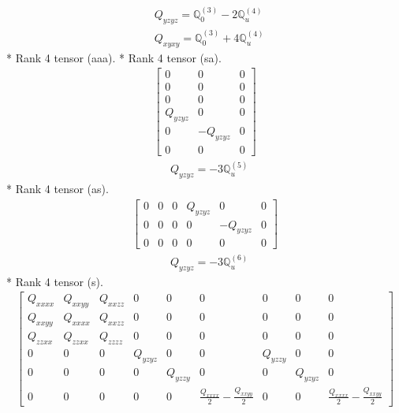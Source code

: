 \documentclass[fleqn,8pt,landscape]{jsarticle}
\begin{document}
\begin{align*}
& Q_{yzyz} = \mathbb{Q}_{0}^{(3)} - 2 \mathbb{Q}_{u}^{(4)} \\
& Q_{xyxy} = \mathbb{Q}_{0}^{(3)} + 4 \mathbb{Q}_{u}^{(4)}
\end{align*}
* Rank 4 tensor (aaa).
* Rank 4 tensor (sa).
\begin{align*}
\begin{bmatrix} 0 & 0 & 0 \\ 0 & 0 & 0 \\ 0 & 0 & 0 \\ Q_{yzyz} & 0 & 0 \\ 0 & - Q_{yzyz} & 0 \\ 0 & 0 & 0 \end{bmatrix}
\end{align*}
\begin{align*}
& Q_{yzyz} = - 3 \mathbb{Q}_{u}^{(5)}
\end{align*}
* Rank 4 tensor (as).
\begin{align*}
\begin{bmatrix} 0 & 0 & 0 & Q_{yzyz} & 0 & 0 \\ 0 & 0 & 0 & 0 & - Q_{yzyz} & 0 \\ 0 & 0 & 0 & 0 & 0 & 0 \end{bmatrix}
\end{align*}
\begin{align*}
& Q_{yzyz} = - 3 \mathbb{Q}_{u}^{(6)}
\end{align*}
* Rank 4 tensor (s).
\begin{align*}
\begin{bmatrix} Q_{xxxx} & Q_{xxyy} & Q_{xxzz} & 0 & 0 & 0 & 0 & 0 & 0 \\ Q_{xxyy} & Q_{xxxx} & Q_{xxzz} & 0 & 0 & 0 & 0 & 0 & 0 \\ Q_{zzxx} & Q_{zzxx} & Q_{zzzz} & 0 & 0 & 0 & 0 & 0 & 0 \\ 0 & 0 & 0 & Q_{yzyz} & 0 & 0 & Q_{yzzy} & 0 & 0 \\ 0 & 0 & 0 & 0 & Q_{yzzy} & 0 & 0 & Q_{yzyz} & 0 \\ 0 & 0 & 0 & 0 & 0 & \frac{Q_{xxxx}}{2} - \frac{Q_{xxyy}}{2} & 0 & 0 & \frac{Q_{xxxx}}{2} - \frac{Q_{xxyy}}{2} \end{bmatrix}
\end{align*}
\end{document}
